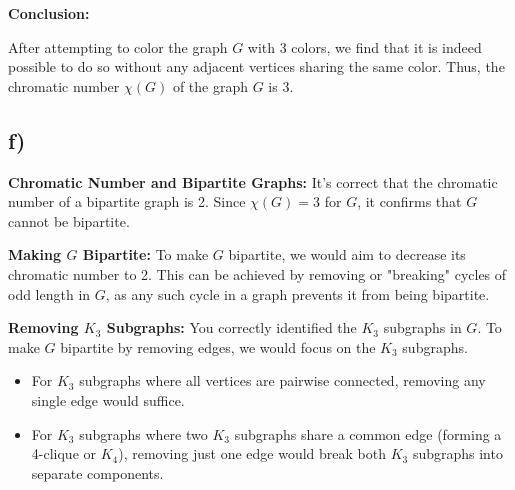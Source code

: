 \documentclass[12pt]{article}
\begin{document}

\textbf{Conclusion:}

After attempting to color the graph \( G \) with 3 colors, we find that it is indeed possible to do so without any adjacent vertices sharing the same color. Thus, the chromatic number \( \chi(G) \) of the graph \( G \) is 3.


\subsection*{f)}

\textbf{Chromatic Number and Bipartite Graphs:} It's correct that the chromatic number of a bipartite graph is 2. Since \( \chi(G) = 3 \) for \( G \), it confirms that \( G \) cannot be bipartite.

\textbf{Making \( G \) Bipartite:} To make \( G \) bipartite, we would aim to decrease its chromatic number to 2. This can be achieved by removing or "breaking" cycles of odd length in \( G \), as any such cycle in a graph prevents it from being bipartite.

\textbf{Removing \( K_3 \) Subgraphs:} You correctly identified the \( K_3 \) subgraphs in \( G \). To make \( G \) bipartite by removing edges, we would focus on the \( K_3 \) subgraphs.

\begin{itemize}
    \item For \( K_3 \) subgraphs where all vertices are pairwise connected, removing any single edge would suffice.
    
    \item For \( K_3 \) subgraphs where two \( K_3 \) subgraphs share a common edge (forming a 4-clique or \( K_4 \)), removing just one edge would break both \( K_3 \) subgraphs into separate components.
\end{itemize}
\end{document}
